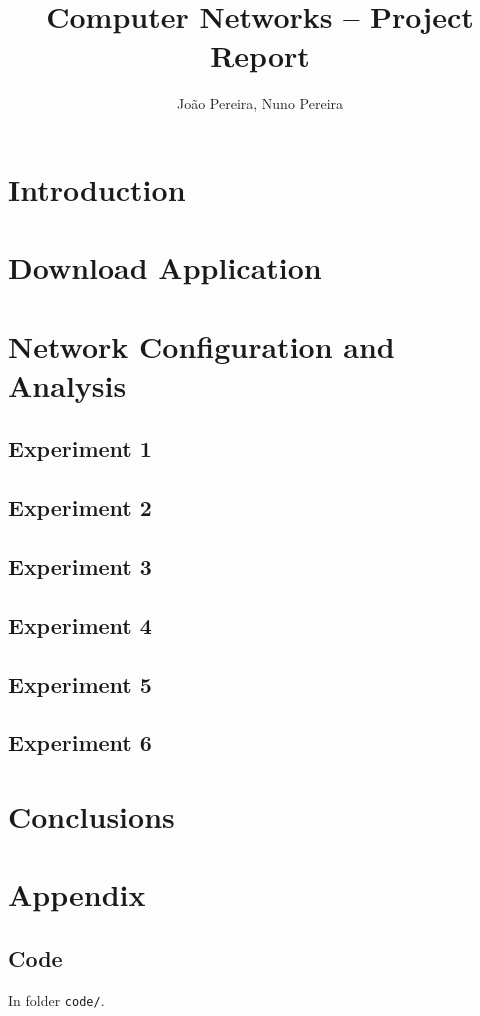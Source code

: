 \documentclass[11pt,a4paper,twocolumn]{article}
\title{Computer Networks -- \nth{2} Project Report}
\author{João Pereira, Nuno Pereira}
\begin{document}
\maketitle

\section{Introduction}

\section{Download Application}

\section{Network Configuration and Analysis}

\subsection{Experiment 1}

\subsection{Experiment 2}

\subsection{Experiment 3}

\subsection{Experiment 4}

\subsection{Experiment 5}

\subsection{Experiment 6}

\section{Conclusions}

\onecolumn
\appendix
\section{Appendix}

\subsection{Code}

\noindent In folder \lstinline{code/}.
\end{document}
